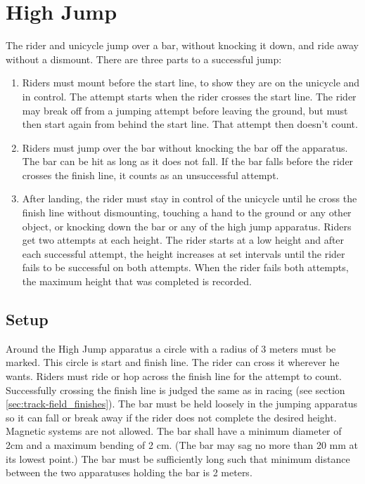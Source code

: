 \section{High Jump}
The rider and unicycle jump over a bar, without knocking it down, and ride away without a dismount.
There are three parts to a successful jump: 
\begin{enumerate}
\item Riders must mount before the start line, to show they are on the unicycle and in control.
The attempt starts when the rider crosses the start line.
The rider may break off from a jumping attempt before leaving the ground, but must then start again from behind the start line.
That attempt then doesn't count.
\item Riders must jump over the bar without knocking the bar off the apparatus.
The bar can be hit as long as it does not fall.
If the bar falls before the rider crosses the finish line, it counts as an unsuccessful attempt.
\item After landing, the rider must stay in control of the unicycle until he cross the finish line without dismounting, touching a hand to the ground or any other object, or knocking down the bar or any of the high jump apparatus.
Riders get two attempts at each height.
The rider starts at a low height and after each successful attempt, the height increases at set intervals until the rider fails to be successful on both attempts.
When the rider fails both attempts, the maximum height that was completed is recorded.
\end{enumerate}

\subsection{Setup}
Around the High Jump apparatus a circle with a radius of 3 meters must be marked.
This circle is start and finish line.
The rider can cross it wherever he wants.
Riders must ride or hop across the finish line for the attempt to count.
Successfully crossing the finish line is judged the same as in racing (see section \ref{sec:track-field_finishes}).
The bar must be held loosely in the jumping apparatus so it can fall or break away if the rider does not complete the desired height.
Magnetic systems are not allowed.
The bar shall have a minimum diameter of 2cm and a maximum bending of 2 cm.
(The bar may sag no more than 20 mm at its lowest point.)
The bar must be sufficiently long such that minimum distance between the two apparatuses holding the bar is 2 meters.


